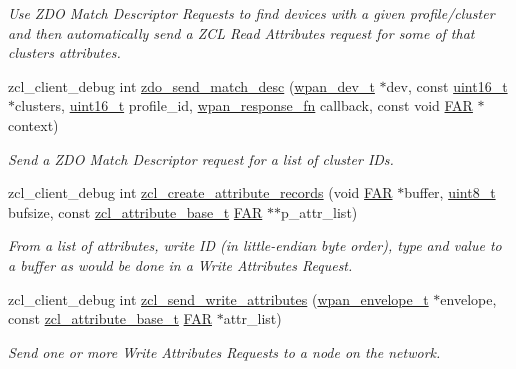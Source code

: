\begin{DoxyCompactItemize}
\begin{DoxyCompactList}\small\item\em Use Z\+DO Match Descriptor Requests to find devices with a given profile/cluster and then automatically send a Z\+CL Read Attributes request for some of that cluster\textquotesingle{}s attributes. \end{DoxyCompactList}\item 
zcl\+\_\+client\+\_\+debug int \hyperlink{group__zcl__client_ga4c75937cc0fa5c70c63f30b59a4ddebc}{zdo\+\_\+send\+\_\+match\+\_\+desc} (\hyperlink{structwpan__dev__t}{wpan\+\_\+dev\+\_\+t} $\ast$dev, const \hyperlink{group__hal__dos_ga5a8b2dc9e45a9ee81a94ef304fb62505}{uint16\+\_\+t} $\ast$clusters, \hyperlink{group__hal__dos_ga5a8b2dc9e45a9ee81a94ef304fb62505}{uint16\+\_\+t} profile\+\_\+id, \hyperlink{group__wpan__aps_gabf0a6b85c9ff3ff9104c8b58c1436d72}{wpan\+\_\+response\+\_\+fn} callback, const void \hyperlink{group__hal_gaef060b3456fdcc093a7210a762d5f2ed}{F\+AR} $\ast$context)
\begin{DoxyCompactList}\small\item\em Send a Z\+DO Match Descriptor request for a list of cluster I\+Ds. \end{DoxyCompactList}\item 
zcl\+\_\+client\+\_\+debug int \hyperlink{group__zcl__client_ga11f72950e4467286ef18468fbcb4bed4}{zcl\+\_\+create\+\_\+attribute\+\_\+records} (void \hyperlink{group__hal_gaef060b3456fdcc093a7210a762d5f2ed}{F\+AR} $\ast$buffer, \hyperlink{group__hal__dos_gae1affc9ca37cfb624959c866a73f83c2}{uint8\+\_\+t} bufsize, const \hyperlink{structzcl__attribute__base__t}{zcl\+\_\+attribute\+\_\+base\+\_\+t} \hyperlink{group__hal_gaef060b3456fdcc093a7210a762d5f2ed}{F\+AR} $\ast$$\ast$p\+\_\+attr\+\_\+list)
\begin{DoxyCompactList}\small\item\em From a list of attributes, write ID (in little-\/endian byte order), type and value to a buffer as would be done in a Write Attributes Request. \end{DoxyCompactList}\item 
zcl\+\_\+client\+\_\+debug int \hyperlink{group__zcl__client_ga98550adc25d4a19e4048ef9b251321ef}{zcl\+\_\+send\+\_\+write\+\_\+attributes} (\hyperlink{structwpan__envelope__t}{wpan\+\_\+envelope\+\_\+t} $\ast$envelope, const \hyperlink{structzcl__attribute__base__t}{zcl\+\_\+attribute\+\_\+base\+\_\+t} \hyperlink{group__hal_gaef060b3456fdcc093a7210a762d5f2ed}{F\+AR} $\ast$attr\+\_\+list)
\begin{DoxyCompactList}\small\item\em Send one or more Write Attributes Requests to a node on the network. \end{DoxyCompactList}\item 
$$
\end{DoxyCompactItemize}
